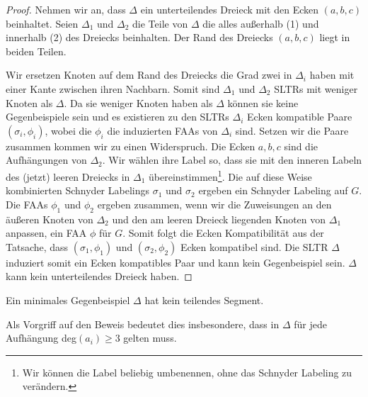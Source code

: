 \begin{proof}
Nehmen wir an, dass $\Delta$ ein unterteilendes Dreieck mit den Ecken $(a,b,c)$ beinhaltet. Seien $\Delta_1$ und $\Delta_2$ die Teile von $\Delta$ die alles außerhalb (1) und innerhalb (2) des Dreiecks beinhalten. Der Rand des Dreiecks $(a,b,c)$ liegt in beiden Teilen.

Wir ersetzen Knoten auf dem Rand des Dreiecks die Grad zwei in $\Delta_i$ haben mit einer Kante zwischen ihren Nachbarn. Somit sind $\Delta_1$ und $\Delta_2$ SLTRs mit weniger Knoten als $\Delta$. Da sie weniger Knoten haben als $\Delta$ können sie keine Gegenbeispiele sein und es existieren zu den SLTRs $\Delta_i$ Ecken kompatible Paare $(\sigma_i,\phi_i)$, wobei die $\phi_i$ die induzierten FAAs von $\Delta_i$ sind. Setzen wir die Paare zusammen kommen wir zu einen Widerspruch. Die Ecken $a,b,c$ sind die Aufhängungen von $\Delta_2$. Wir wählen ihre Label so, dass sie mit den inneren Labeln des (jetzt) leeren Dreiecks in $\Delta_1$ übereinstimmen\footnote{Wir können die Label beliebig umbenennen, ohne das Schnyder Labeling zu verändern.}. Die auf diese Weise kombinierten Schnyder Labelings $\sigma_1$ und $\sigma_2$ ergeben ein Schnyder Labeling auf $G$. Die FAAs $\phi_1$ und $\phi_2$ ergeben zusammen, wenn wir die Zuweisungen an den äußeren Knoten von $\Delta_2$ und den am leeren Dreieck liegenden Knoten von $\Delta_1$ anpassen, ein FAA $\phi$ für $G$. Somit folgt die Ecken Kompatibilität aus der Tatsache, dass $(\sigma_1,\phi_1)$ und $(\sigma_2,\phi_2)$ Ecken kompatibel sind. Die SLTR $\Delta$ induziert somit ein Ecken kompatibles Paar und kann kein Gegenbeispiel sein. $\Delta$ kann kein unterteilendes Dreieck haben.
\end{proof} 

\begin{lemma}\label{lem3}
Ein minimales Gegenbeispiel $\Delta$ hat kein teilendes Segment.
\end{lemma}

\begin{remark}
Als Vorgriff auf den Beweis bedeutet dies insbesondere, dass in $\Delta$ für jede Aufhängung deg$(a_i) \geq 3$ gelten muss.
\end{remark}

